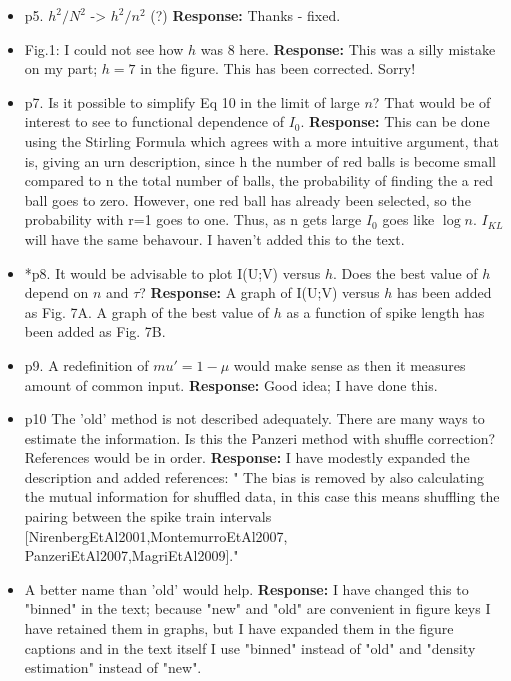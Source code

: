 \documentclass[12pt]{article}
\begin{document}
\begin{itemize}
\item p5. $h^2/N^2$ -> $h^2/n^2$ (?) \textbf{Response:} Thanks - fixed.

\item Fig.1: I could not see how $h$ was 8 here.  \textbf{Response:} This was a silly mistake on my part; $h=7$ in the figure. This has
   been corrected. Sorry!

\item p7. Is it possible to simplify Eq 10 in the limit of large $n$?
  That would be of interest to see to functional dependence of $I_0$.
  \textbf{Response:} This can be done using the Stirling Formula which
  agrees with a more intuitive argument, that is, giving an urn
  description, since h the number of red balls is become small
  compared to n the total number of balls, the probability of finding
  the a red ball goes to zero. However, one red ball has already been
  selected, so the probability with r=1 goes to one. Thus, as n gets
  large $I_0$ goes like $\log{n}$. $I_{KL}$ will have the same behavour. I
  haven't added this to the text.

\item *p8. It would be advisable to plot I(U;V) versus $h$.  Does the best
value of $h$ depend on $n$ and $\tau$?  \textbf{Response:} A graph of I(U;V) versus $h$ has been added as Fig. 7A. A graph of
   the best value of $h$ as a function of spike length has been added
   as Fig. 7B.

\item p9. A redefinition of $mu'=1-\mu$ would make sense as then it
 measures amount of common input. \textbf{Response:} Good idea; I have done this.

\item p10 The 'old' method is not described adequately. There are many ways
to estimate the information. Is this the Panzeri method with shuffle
correction? References would be in order.  \textbf{Response:} I have modestly expanded the description and added references: "
The bias is removed by also calculating the mutual information for
shuffled data, in this case this means shuffling the pairing between
the spike train intervals [NirenbergEtAl2001,MontemurroEtAl2007,
PanzeriEtAl2007,MagriEtAl2009]."

\item A better name than 'old' would help.  \textbf{Response:} I have changed this to "binned" in the text; because "new" and
   "old" are convenient in figure keys I have retained them in graphs,
   but I have expanded them in the figure captions and in the text
   itself I use "binned" instead of "old" and "density estimation"
   instead of "new".


\end{itemize}
\end{document}
